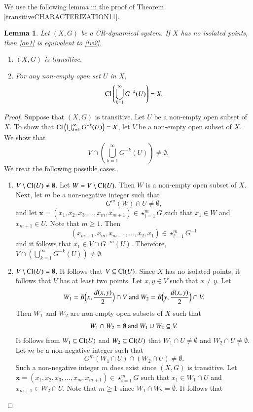 \documentclass[a4paper,12pt]{article} %
\newtheorem{lemma}[theorem]{Lemma}
\newcommand{\Cl}  {\mathop{\rm Cl}\nolimits}
\begin{document}
We use the following lemma in the proof of Theorem \ref{transitiveCHARACTERIZATION11}.
\begin{lemma}\label{lemai}
Let $(X,G)$ be a CR-dynamical system. If $X$ has no isolated points, then \ref{on1} is equivalent to  \ref{tw2}.
\begin{enumerate}
\item\label{on1} $(X,G)$ is transitive.
\item\label{tw2} For any non-empty  open set $U$ in $X$, 
$$
\Cl\left(\bigcup_{k=1}^{\infty}G^{-k}(U)\right)=X.
$$
\end{enumerate}
\end{lemma}
\begin{proof}
Suppose that $(X,G)$ is transitive. 
Let $U$ be a non-empty open subset of $X$. To show that $\Cl\left(\bigcup_{k=1}^{\infty}G^{-k}(U)\right)=X$, let $V$ be a non-empty open subset of $X$.  We show that 
$$
V\cap \left(\bigcup_{k=1}^{\infty}G^{-k}(U)\right)\neq \emptyset.
$$
We treat the following possible cases.
\begin{enumerate}
\item $V\setminus \Cl(U)\neq \emptyset$.  Let $W=V\setminus \Cl(U)$. Then $W$ is a non-empty open subset of $X$.  Next, let $m$ be a non-negative integer such that 
$$
G^m(W)\cap U\neq \emptyset,
$$
and let $\mathbf x=(x_1,x_2,x_3,\ldots, x_m,x_{m+1})\in \star_{i=1}^{m}G$ such that $x_1\in W$ and $x_{m+1}\in U$.  Note that $m\geq 1$.  Then 
$$
(x_{m+1},x_m,x_{m-1},\ldots, x_2,x_{1})\in \star_{i=1}^{m}G^{-1}
$$
and it follows that $x_{1}\in V\cap G^{-m}(U)$. Therefore, 
$
V\cap \left(\bigcup_{k=1}^{\infty}G^{-k}(U)\right)\neq \emptyset.
$
 \item $V\setminus \Cl(U)=\emptyset$.   It follows that $V\subseteq \Cl(U)$.  Since $X$ has no isolated points, it follows that $V$ has at least two points.  Let $x,y\in V$ such that $x\neq y$.  Let 
 $$
 W_1=B\Big(x,\frac{d(x,y)}{2}\Big)\cap V \textup{ and } W_2=B\Big(y,\frac{d(x,y)}{2}\Big)\cap V.
 $$
 Then $W_1$ and $W_2$ are non-empty open subsets of $X$ such that 
 $$
 W_1\cap W_2=\emptyset \textup{ and } W_1\cup W_2\subseteq V.
 $$
 It follows from $W_1\subseteq \Cl(U)$ and $W_2\subseteq \Cl(U)$ that $W_1\cap U\neq \emptyset$ and $W_2\cap U\neq \emptyset$. Let $m$ be a non-negative integer such that 
 $$
 G^m(W_1\cap U)\cap(W_2\cap U)\neq \emptyset.
 $$ 
 Such a non-negative integer $m$ does exist since $(X,G)$ is transitive.  Let $\mathbf x=(x_1,x_2,x_3,\ldots, x_m,x_{m+1})\in \star_{i=1}^{m}G$ such that $x_1\in W_1\cap U$ and $x_{m+1}\in W_2\cap U$.  Note that $m\geq 1$ since $W_1\cap W_2= \emptyset$.   It follows that

\end{enumerate}
\end{proof}
\end{document}
